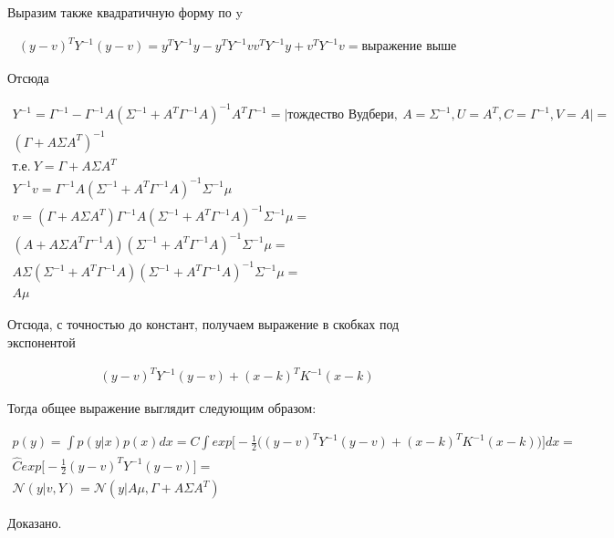 Выразим также квадратичную форму по y

\begin{gather*}
	(y-v)^T Y^{-1} (y-v) = y^T Y^{-1} y - y^T Y^{-1} v v^T Y^{-1} y + v^T Y^{-1} v = \text{выражение выше}
\end{gather*}

Отсюда 

\begin{gather*}
	Y^{-1} = \Gamma^{-1} - \Gamma^{-1} A (\Sigma^{-1} + A^T\Gamma^{-1}A)^{-1}A^T\Gamma^{-1} = \Big| \text{тождество Вудбери}, \ A = \Sigma^{-1}, U=A^T, C=\Gamma^{-1}, V = A \Big| = \\
	(\Gamma + A \Sigma A^T)^{-1} \\
	\text{т.е.} \ Y = \Gamma + A \Sigma A^T \\
	Y^{-1}v = \Gamma^{-1}A(\Sigma^{-1}+A^T\Gamma^{-1}A)^{-1}\Sigma^{-1}\mu \\
	v = (\Gamma + A \Sigma A^T) \Gamma^{-1}A(\Sigma^{-1}+A^T\Gamma^{-1}A)^{-1}\Sigma^{-1}\mu = \\
	(A + A \Sigma A^T \Gamma^{-1} A) (\Sigma^{-1}+A^T\Gamma^{-1}A)^{-1}\Sigma^{-1}\mu = \\
	A \Sigma (\Sigma^{-1} + A^T \Gamma^{-1} A) (\Sigma^{-1}+A^T\Gamma^{-1}A)^{-1}\Sigma^{-1}\mu = \\
	A \mu
\end{gather*}

Отсюда, с точностью до констант, получаем выражение в скобках под экспонентой

\begin{gather*}
	(y-v)^T Y^{-1} (y-v) + (x-k)^T K^{-1} (x-k) 
\end{gather*}

Тогда общее выражение выглядит следующим образом:

\begin{gather*}
	p(y) = \int p(y|x) p(x) dx = C \int exp \bigg[ -\frac{1}{2}\Big( (y-v)^T Y^{-1} (y-v) + (x-k)^T K^{-1} (x-k) \Big) \bigg] dx = \\
	\hat{C} exp \bigg[ -\frac{1}{2} (y-v)^T Y^{-1} (y-v) \bigg] = \\
	\mathcal{N} (y | v, Y) = \mathcal{N} (y| A\mu , \Gamma + A \Sigma A^T)
\end{gather*}

Доказано.